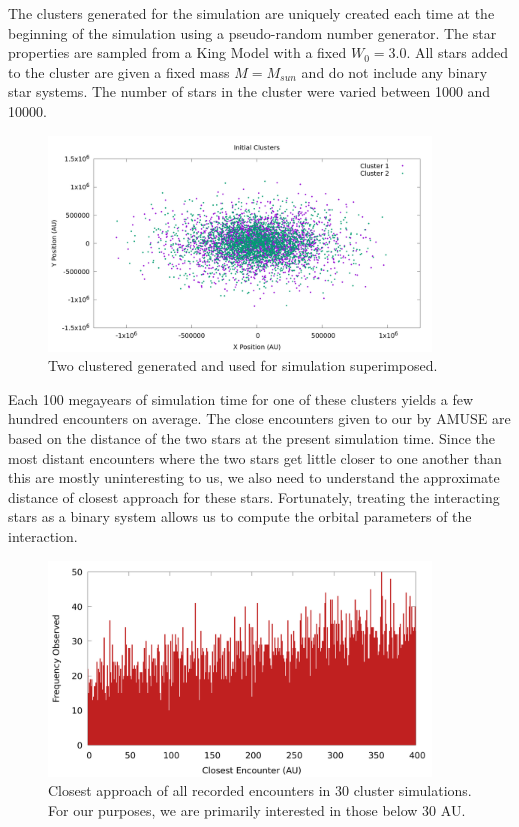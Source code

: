 \documentclass[12pt]{article}
\begin{document}
    The clusters generated for the simulation are uniquely created each time at the
    beginning of the simulation using a pseudo-random number generator. 
    The star properties are sampled from a
    King Model with a fixed $W_0=3.0$. %
    All stars added to the cluster are given a fixed mass $M=M_{sun}$ and do not
    include any binary star systems. The number
    of stars in the cluster were varied between 1000 and 10000. 

    \begin{figure}[h]
        \centering
        \caption{Two clustered generated and used for simulation superimposed.}
        \includegraphics[width=4.0in]{cluster_superimposed.png}
    \end{figure}

    Each 100 megayears of simulation time for one of these clusters yields a
    few hundred encounters on average. The close encounters given to our by 
    AMUSE are based on the distance of the two stars at the present simulation time.
    Since the most distant encounters where the two stars get little closer to one
    another than this are mostly uninteresting to us, we also need to understand
    the approximate distance of closest approach for these stars. Fortunately, treating
    the interacting stars as a binary system allows us to compute the orbital parameters
    of the interaction. 


    \begin{figure}[h]
        \centering
        \caption{Closest approach of all recorded encounters in 30 cluster simulations.
            For our purposes, we are primarily interested in those below 30 AU.}
        \includegraphics[width=4.0in]{encounter_distance_frequency}
    \end{figure}
\end{document}

